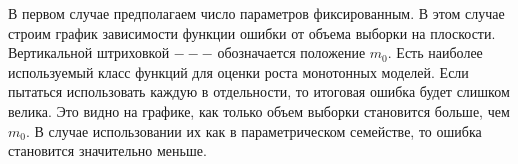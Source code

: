 \documentclass[12pt, twoside]{article}
\begin{document}
В первом случае предполагаем число параметров фиксированным. В этом случае строим график зависимости функции ошибки от объема выборки на плоскости. Вертикальной штриховкой $---$ обозначается положение $m_0$. Есть наиболее используемый класс функций для оценки роста монотонных моделей. Если пытаться использовать каждую в отдельности, то итоговая ошибка будет слишком велика. Это видно на графике, как только объем выборки становится больше, чем $m_0$. В случае использовании их как в параметрическом семействе, то ошибка становится значительно меньше. 



\end{document}
